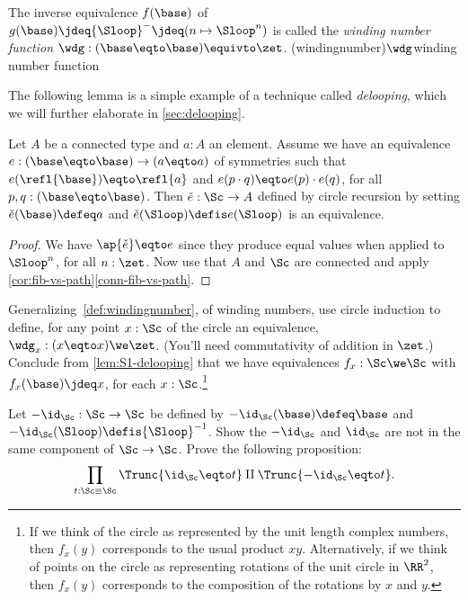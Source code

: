 \begin{definition}\label{def:windingnumber}
The inverse equivalence $f(\base)$ of $g(\base)\jdeq{\Sloop}^{-}
\jdeq(n\mapsto \Sloop^n)$ is called the \emph{winding number function}
  $\wdg : (\base \eqto\base) \equivto \zet$.
  \glossary(windingnumber){$\protect\wdg$}{winding number function}
\end{definition}
The following lemma is a simple example of a technique called 
\emph{delooping}, which we will further elaborate in \cref{sec:delooping}.
\begin{lemma}\label{lem:S1-delooping}
Let $A$ be a connected type and $a:A$ an element.
Assume we have an equivalence $e:(\base\eqto\base) \to (a\eqto a)$
of symmetries such that $e(\refl{\base})\eqto\refl{a}$
and $e(p\cdot q)\eqto e(p)\cdot e(q)$, for all $p,q:(\base\eqto\base)$.
Then $\check e : \Sc\to A$ defined by circle recursion by setting
$\check e(\base)\defeq a$ and $\check e(\Sloop)\defis e(\Sloop)$
is an equivalence.
\end{lemma}
\begin{proof}
We have $\ap{\check e}\eqto e$ since they produce equal values when applied
to $\Sloop^n$, for all $n:\zet$. Now use that $A$ and $\Sc$ are connected and
apply \cref{cor:fib-vs-path}\ref{conn-fib-vs-path}.
\end{proof}

\begin{xca}\label{xca:general-winding}
  Generalizing~\cref{def:windingnumber}, of winding numbers, use
  circle induction to define, for any point $x:\Sc$ of the circle an
  equivalence, $\wdg_x : (x \eqto x) \we \zet$.  (You'll need
  commutativity of addition in $\zet$.)  Conclude from
  \cref{lem:S1-delooping} that we have equivalences
  $f_x : \Sc \we \Sc$ with $f_x(\base) \jdeq x$, for each
  $x:\Sc$.\footnote{%
    If we think of the circle as represented by the unit length
    complex numbers, then $f_x(y)$ corresponds to the usual product
    $xy$.  Alternatively, if we think of points on the circle as
    representing rotations of the unit circle in $\RR^2$, then $f_x(y)$
    corresponds to the composition of the rotations by $x$ and $y$.}
\end{xca}

\begin{xca}\label{xca:S1=S1-components}
Let $-\id_\Sc : \Sc\to\Sc$ be defined by $-\id_\Sc(\base)\defeq\base$
and $-\id_\Sc(\Sloop)\defis{\Sloop}^{-1}$. Show the $-\id_\Sc$
and $\id_\Sc$ are not in the same component of $\Sc\to\Sc$.
Prove the following proposition:
\[
\prod_{t:\Sc\equiv\Sc}{\Trunc{\id_\Sc\eqto t}\amalg \Trunc{-\id_\Sc\eqto t}}.\qedhere
\]
\end{xca}

